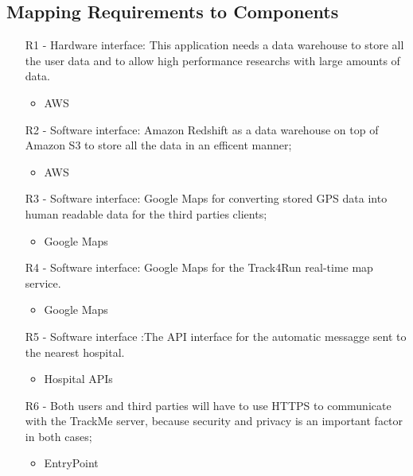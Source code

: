 {\color{bluesec}\subsection{Mapping Requirements to Components}}


\begin{itemize}


\item [R1] - Hardware interface: This application needs a data warehouse to store all the user data and to allow high performance researchs with large amounts of data.
\begin{itemize}
	\item AWS
\end{itemize}


\item [R2] - Software interface: Amazon Redshift as a data warehouse on top of Amazon S3 to store all the data in an efficent manner;
\begin{itemize}
	\item AWS
\end{itemize}


\item [R3] - Software interface: Google Maps for converting stored GPS data into human readable data for the third parties clients;
\begin{itemize}
	\item Google Maps
\end{itemize}


\item [R4] - Software interface: Google Maps for the Track4Run real-time map service.
\begin{itemize}
	\item Google Maps
\end{itemize}


\item [R5] - Software interface :The API interface for the automatic messagge sent to the nearest hospital.
\begin{itemize}
	\item Hospital APIs
\end{itemize}


\item [R6] - Both users and third parties will have to use HTTPS to communicate with the TrackMe server, because security and privacy is an important factor in both cases;
\begin{itemize}
	\item EntryPoint
\end{itemize}



\end{itemize}
